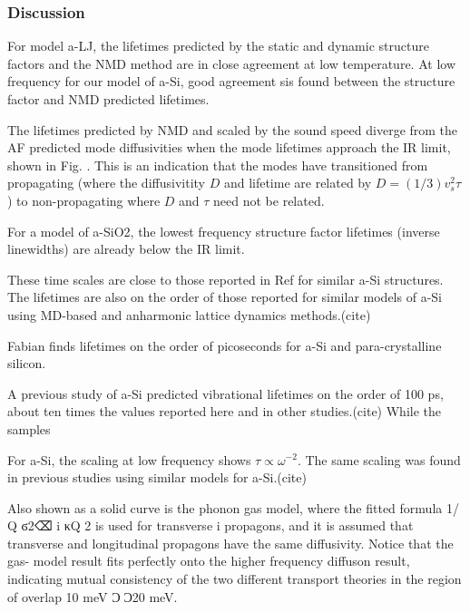 \documentclass[aps,prb,twocolumn,superscriptaddress,footinbib,amsmath,amssymb,floatfix]{revtex4}
\begin{document}
\subsubsection{\label{S:Life_NMD}Discussion}

For model a-LJ, the lifetimes predicted by the static and dynamic 
structure factors and the NMD method are in close agreement 
at low temperature.\cite{mazzacurati_low-frequency_1996} 
At low frequency for our model of a-Si, good 
agreement sis found between the structure factor and NMD predicted 
lifetimes.

The lifetimes predicted by NMD and scaled by the sound speed 
diverge from the AF predicted mode diffusivities when the mode 
lifetimes approach the IR limit, shown in 
Fig. . This is an indication that the modes have transitioned 
from propagating (where the diffusivitity $D$ and lifetime are 
related by $D = (1/3)v^2_s\tau$) to non-propagating where 
$D$ and $\tau$ need not be related.
\cite{allen_thermal_1993,feldman_thermal_1993,feldman_numerical_1999,
allen_evolution_1998}


For a model of a-SiO2, the lowest frequency structure factor 
lifetimes (inverse linewidths) are already below the IR limit.
\cite{taraskin_phonons_1997}

These time scales are close to those reported in Ref for similar 
a-Si structures. The lifetimes are also on the order of those
reported for similar models of a-Si using MD-based and anharmonic 
lattice dynamics methods.(cite) 

Fabian finds lifetimes on the order of picoseconds for a-Si and 
para-crystalline silicon.
\cite{fabian_anharmonic_1996,fabian_numerical_2003}

A previous study of a-Si predicted vibrational lifetimes on the 
order of 100 ps, about ten times the values reported here and in 
other studies.(cite) While the samples 

For a-Si, the scaling at low frequency shows 
$\tau \propto \omega^{-2}$.  The same scaling was found in previous 
studies using similar models for a-Si.(cite) 

Also
shown as a solid curve is the phonon gas model, where the
fitted formula 1/␶ Q ϭ2⌫ i κQ 2
is used for transverse
i
propagons, and it is assumed that transverse and longitudinal
propagons have the same diffusivity. Notice that the gas-
model result fits perfectly onto the higher frequency diffuson
result, indicating mutual consistency of the two different
transport theories in the region of overlap 10 meV Ͻ␻Ͻ20
meV.
\end{document}
